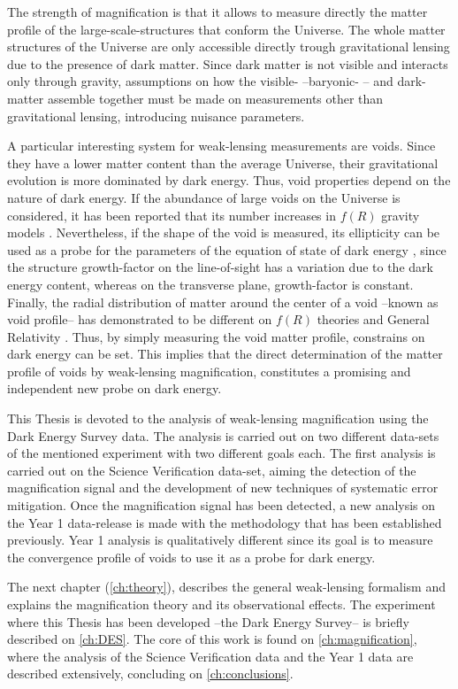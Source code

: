 The strength of magnification is that it allows to measure directly the matter profile of the large-scale-structures that conform the Universe. The whole matter structures of the Universe are only accessible directly trough gravitational lensing due to the presence of dark matter. Since dark matter is not visible and interacts only through gravity, assumptions on how the visible- --baryonic- -- and dark- matter assemble together must be made on measurements other than gravitational lensing, introducing nuisance parameters.
\newline

A particular interesting system for weak-lensing measurements are voids. Since they have a lower matter content than the average Universe, their gravitational evolution is more dominated by dark energy. Thus, void properties depend on the nature of dark energy. If the abundance of large voids on the Universe is considered, it has been reported that its number increases in $f(R)$ gravity models \cite{2012MNRAS.421.3481L,2017JCAP...03..012V}. Nevertheless, if the shape of the void is measured, its ellipticity can be used as a probe for the parameters of the equation of state of dark energy \cite{2010MNRAS.403.1392L,0004-637X-754-2-109,PhysRevLett.98.081301,2013PhRvL.111x1103S}, since the structure growth-factor on the line-of-sight has a variation due to
the dark energy content, whereas on the transverse plane, growth-factor is constant. Finally, the radial distribution of matter around the center of a void --known as void profile-- has demonstrated to be different on $f(R)$ theories and General Relativity \cite{2014APh....54...44A,2014arXiv1410.8355C,2015MNRAS.451.4215Z,2015JCAP...08..028B,2016PhRvD..93j3522A,2016PhRvD..94j3524A}. Thus, by simply measuring the void matter profile, constrains on dark energy can be set. This implies that the direct determination of the matter profile of voids by weak-lensing magnification, constitutes a promising and independent new probe on dark energy.
\newline

This Thesis is devoted to the analysis of weak-lensing magnification using the Dark Energy Survey data. The analysis is carried out on two different data-sets of the mentioned experiment with two different goals each. The first analysis is carried out on the Science Verification data-set, aiming the detection of the magnification signal and the development of new techniques of systematic error mitigation. Once the magnification signal has been detected, a new analysis on the Year 1 data-release is made with the methodology that has been established previously. Year 1 analysis is qualitatively different since its goal is to measure the convergence profile of voids to use it as a probe for dark energy.
\newline

The next chapter (\autoref{ch:theory}), describes the general weak-lensing formalism and explains the magnification theory and its observational effects. The experiment where this Thesis has been developed --the Dark Energy Survey-- is briefly described on \autoref{ch:DES}. The core of this work is found on \autoref{ch:magnification}, where the analysis of the Science Verification data and the Year 1 data are described extensively, concluding on \autoref{ch:conclusions}.
